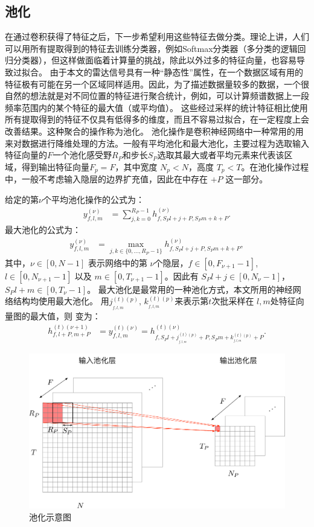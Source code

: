 \subsection{池化}
在通过卷积获得了特征之后，下一步希望利用这些特征去做分类。理论上讲，人们可以用所有提取得到的特征去训练分类器，例如Softmax分类器（多分类的逻辑回归分类器），但这样做面临着计算量的挑战，除此以外过多的特征向量，也容易导致过拟合。
由于本文的雷达信号具有一种“静态性”属性，在一个数据区域有用的特征极有可能在另一个区域同样适用。因此，为了描述数据量较多的数据，一个很自然的想法就是对不同位置的特征进行聚合统计，例如，可以计算频谱数据上一段频率范围内的某个特征的最大值（或平均值）。
这些经过采样的统计特征相比使用所有提取得到的特征不仅具有低得多的维度，而且不容易过拟合，在一定程度上会改善结果。这种聚合的操作称为池化。
池化操作是卷积神经网络中一种常用的用来对数据进行降维处理的方法。一般有平均池化和最大池化，主要过程为选取输入特征向量的$F$一个池化感受野$R_P$和步长$S_P$选取其最大或者平均元素来代表该区域，得到输出特征向量$F_p=F$，其中宽度 $N_p<N$，高度 $T_p<T$。在池化操作过程中，一般不考虑输入隐层的边界扩充值，因此在中存在 $+P$ 这一部分。

给定的第$\nu$个平均池化操作的公式为：
\begin{align}
  y_{f,l,m}^{(\nu)}&=\sum^{R_P-1}_{j,k=0} h_{f,S_Pl+j+P,S_Pm+k+P}^{(\nu)}.
  \label{equ:pool}
\end{align}
最大池化的公式为：
\begin{align}
  y_{f,l,m}^{(\nu)}&=\max_{j,k \in \{0, \ldots, R_P-1\}} h_{f,S_Pl+j+P,S_Pm+k+P}^{(\nu)},
  \label{equ:maxpool}
\end{align}
其中，$\nu \in [0,N-1 ]$ 表示网络中的第 $\nu$个隐层，$f\in[0,F_{\nu+1}-1]$, $l\in[0,N_{\nu+1}-1 ]$ 以及 $m\in[0,T_{\nu+1}-1 ]$。因此有 $S_Pl+j\in[0,N_\nu-1 ]$， $S_Pl+m\in[0,T_\nu-1 ]$。
最大池化是最常用的一种池化方式，本文所用的神经网络结构均使用最大池化。
用$j^{(t)(p)}_{_{f,l,m}},\,k^{(t)(p)}_{_{f,l,m}}$来表示第$t$次批采样在 $l,m$处特征向量图的最大值，则 变为：
\begin{align}
h_{f,l+P,m+P}^{(t)(\nu+1)}&=y_{f,l,m}^{(t)(\nu)}=
h^{(t)(\nu)}_{f,S_P l+j^{(t)(p)}_{_{f,l,m}}+P,S_Pm+k^{(t)(p)}_{_{f,l,m}}+P}.
\end{align}

\begin{figure}[hbt]
	\centering
	\includegraphics[width=13.5cm]{figures/networks/pooling}
	\caption{池化示意图}
	\label{fig:pool}
\end{figure}

